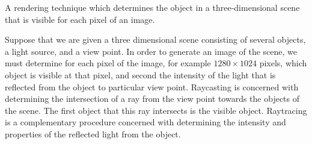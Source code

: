 

{%
    A rendering technique which determines the object in a three-dimensional scene that is visible for each pixel of an image.

    Suppose that we are given a three dimensional scene consisting of several objects, a light source, and a view point.
    In order to generate an image of the scene, we must determine for each pixel of the image, for example \( 1280 \times 1024\) pixels, which object is visible at that pixel, and second the intensity of the light that is reflected from the object to particular view point.
    Raycasting is concerned with determining the intersection of a ray from the view point towards the objects of the scene.
    The first object that this ray intersects is the visible object.
    Raytracing is a complementary procedure concerned with determining the intensity and properties of the reflected light from the object.
}

